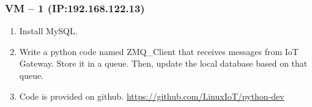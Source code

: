 \documentclass[letterpaper,10pt,english]{sphinxmanual}
\begin{document}
\subsubsection{VM – 1 (IP:192.168.122.13)}
\label{week-13:vm-1-ip-192-168-122-13}\begin{enumerate}
\item {} 
Install MySQL.

\item {} 
Write a python code named ZMQ\_Client that receives messages from IoT Gateway. Store it in a  queue. Then, update the local database based on that queue.

\item {} 
Code is provided on github. \href{https://github.com/LinuxIoT/python-dev}{https://github.com/LinuxIoT/python-dev}

\end{enumerate}
\end{document}
